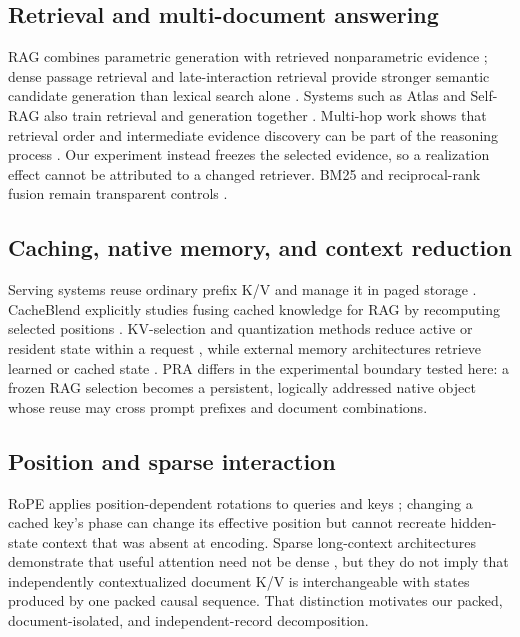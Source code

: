 \documentclass[11pt]{article}
\begin{document}
\subsection{Retrieval and multi-document answering}
RAG combines parametric generation with retrieved nonparametric evidence
\cite{lewis2020rag}; dense passage retrieval and late-interaction retrieval
provide stronger semantic candidate generation than lexical search alone
\cite{karpukhin2020dpr,khattab2020colbert}. Systems such as Atlas and Self-RAG
also train retrieval and generation together
\cite{izacard2023atlas,asai2024selfrag}. Multi-hop work shows that retrieval
order and intermediate evidence discovery can be part of the reasoning process
\cite{trivedi2023ircot,xiong2021mdr}. Our experiment instead freezes the
selected evidence, so a realization effect cannot be attributed to a changed
retriever. BM25 and reciprocal-rank fusion remain transparent controls
\cite{robertson2009bm25,cormack2009rrf}.

\subsection{Caching, native memory, and context reduction}
Serving systems reuse ordinary prefix K/V and manage it in paged storage
\cite{kwon2023vllm,gim2023promptcache}. CacheBlend explicitly studies fusing
cached knowledge for RAG by recomputing selected positions
\cite{yao2024cacheblend}. KV-selection and quantization methods reduce active
or resident state within a request
\cite{zhang2023h2o,li2024snapkv,tang2024quest,liu2024kivi}, while external
memory architectures retrieve learned or cached state
\cite{wu2022memorizing,borgeaud2022retro,mohtashami2023landmark}. PRA differs
in the experimental boundary tested here: a frozen RAG selection becomes a
persistent, logically addressed native object whose reuse may cross prompt
prefixes and document combinations.

\subsection{Position and sparse interaction}
RoPE applies position-dependent rotations to queries and keys
\cite{su2021roformer}; changing a cached key's phase can change its effective
position but cannot recreate hidden-state context that was absent at encoding.
Sparse long-context architectures demonstrate that useful attention need not
be dense \cite{beltagy2020longformer,zaheer2020bigbird,roy2021routing}, but they
do not imply that independently contextualized document K/V is interchangeable
with states produced by one packed causal sequence. That distinction motivates
our packed, document-isolated, and independent-record decomposition.
\end{document}
